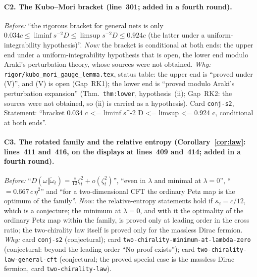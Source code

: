 \documentclass[11pt]{article}
\theoremstyle{accent}
\theoremstyle{definition}
\begin{document}
{\paragraph{C2. The Kubo--Mori bracket (line~301; added in a fourth round).}
\emph{Before:} ``the rigorous bracket for general nets is only \(0.034c\le\liminf s^{-2}D\le\limsup
s^{-2}D\le0.924c\) (the latter under a uniform-integrability hypothesis)''.
\emph{Now:} the bracket is conditional at both ends: the upper end under a uniform-integrability
hypothesis that is open, the lower end modulo Araki's perturbation theory, whose sources were not obtained.
\emph{Why:} \texttt{rigor/kubo\_mori\_gauge\_lemma.tex}, status table: the upper end is ``proved under (V)'', and (V) is open (Gap~RK1); the lower end is ``proved modulo Araki's perturbation expansion'' (Thm.~\texttt{thm:lower}, hypothesis~(ii); Gap~RK2: the sources were not obtained, so (ii) is carried as a hypothesis).  Card \texttt{conj-s2}, Statement: ``bracket 0.034 c <= liminf s\^{}-2 D <= limsup <= 0.924 c, conditional at both ends''.
\paragraph{C3. The rotated family and the relative entropy (Corollary~\ref{cor:law}: lines~411 and~416, on the displays at lines~409 and~414; added
in a fourth round).}
\emph{Before:} ``\(D(\omega\Vert\widetilde\omega_t)=\frac{c}{12}\zeta_t^2+o(\zeta_t^2)\)'', ``even in \(\lambda\) and
minimal at \(\lambda=0\)'', ``\(=0.667\,c\,\eta^2\)'' and ``for a two-dimensional CFT the ordinary Petz map is the optimum
of the family''.
\emph{Now:} the relative-entropy statements hold if \(s_2=c/12\), which is a conjecture; the minimum at \(\lambda=0\), and
with it the optimality of the ordinary Petz map within the family, is proved only at leading order in the cross ratio;
the two-chirality law itself is proved only for the massless Dirac fermion.
\emph{Why:} card \texttt{conj-s2} (conjectural); card \texttt{two-chirality-minimum-at-lambda-zero} (conjectural: beyond the
leading order ``No proof exists''); card \texttt{two-chirality-law-general-cft} (conjectural; the proved special case is
the massless Dirac fermion, card \texttt{two-chirality-law}).
\par}
\end{document}
